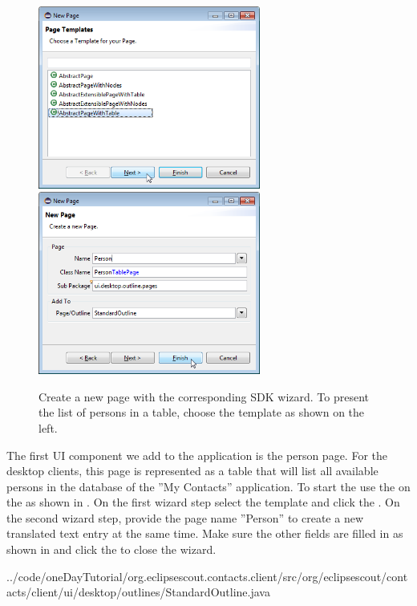 \documentclass[a4paper,10pt,twoside]{book}
\begin{document}
\begin{figure}
\includegraphics[height=6cm]{new_page_person_1.png} \hspace{2mm}
\includegraphics[height=6cm]{new_page_person_2.png}
\caption{Create a new page with the corresponding SDK wizard. To present the list of persons in a table, choose the template  as shown on the left.}
\end{figure}

The first UI component we add to the application is the person page. 
For the desktop clients, this page is represented as a table that will list all available persons in the database of the ''My Contacts'' application. 
To start the  use the  on the  as shown in .
On the first wizard step select the template  and click the . 
On the second wizard step, provide the page name ''Person'' to create a new translated text entry at the same time. 
Make sure the other fields are filled in as shown in  and click the  to close the wizard.


{../code/oneDayTutorial/org.eclipsescout.contacts.client/src/org/eclipsescout/contacts/client/ui/desktop/outlines/StandardOutline.java}
\end{document}
